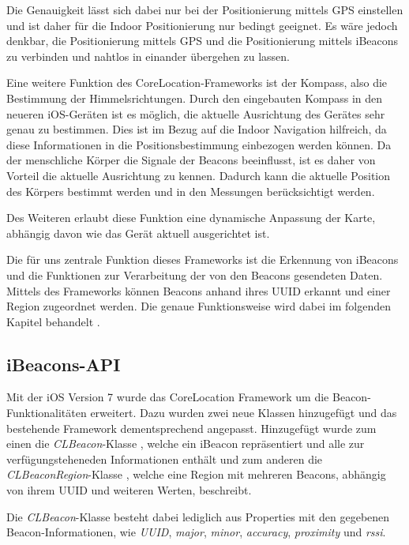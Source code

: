Die Genauigkeit lässt sich dabei nur bei der Positionierung mittels GPS einstellen und ist daher für die Indoor Positionierung nur bedingt geeignet. Es wäre jedoch denkbar, die Positionierung mittels GPS und die Positionierung mittels iBeacons zu verbinden und nahtlos in einander übergehen zu lassen.

Eine weitere Funktion des CoreLocation-Frameworks ist der Kompass, also die Bestimmung der Himmelsrichtungen. Durch den eingebauten Kompass in den neueren iOS-Geräten ist es möglich, die aktuelle Ausrichtung des Gerätes sehr genau zu bestimmen. Dies ist im Bezug auf die Indoor Navigation hilfreich, da diese Informationen in die Positionsbestimmung einbezogen werden können. Da der menschliche Körper die Signale der Beacons beeinflusst, ist es daher von Vorteil die aktuelle Ausrichtung zu kennen. Dadurch kann die aktuelle Position des Körpers bestimmt werden und in den Messungen berücksichtigt werden.

Des Weiteren erlaubt diese Funktion eine dynamische Anpassung der Karte, abhängig davon wie das Gerät aktuell ausgerichtet ist.

Die für uns zentrale Funktion dieses Frameworks ist die Erkennung von iBeacons und die Funktionen zur Verarbeitung der von den Beacons gesendeten Daten.
Mittels des Frameworks können Beacons anhand ihres UUID erkannt und einer Region zugeordnet werden. Die genaue Funktionsweise wird dabei im folgenden Kapitel behandelt \cite{corelocation}.

\subsection{iBeacons-API}
\label{sec:technologies:corelocation:ibeaconsapi}
Mit der iOS Version 7 wurde das CoreLocation Framework um die Beacon-Funktionalitäten erweitert. 
Dazu wurden zwei neue Klassen hinzugefügt und das bestehende Framework dementsprechend angepasst. 
Hinzugefügt wurde zum einen die \emph{CLBeacon}-Klasse \cite{clbeaconref}, welche ein iBeacon repräsentiert und alle zur verfügungsteheneden Informationen enthält und zum anderen die \emph{CLBeaconRegion}-Klasse \cite{clbeaconregionref}, welche eine Region mit mehreren Beacons, abhängig von ihrem UUID und weiteren Werten, beschreibt.

Die \emph{CLBeacon}-Klasse besteht dabei lediglich aus Properties mit den gegebenen Beacon-Informationen, wie \emph{UUID}, \emph{major}, \emph{minor}, \emph{accuracy}, \emph{proximity} und \emph{rssi}.

